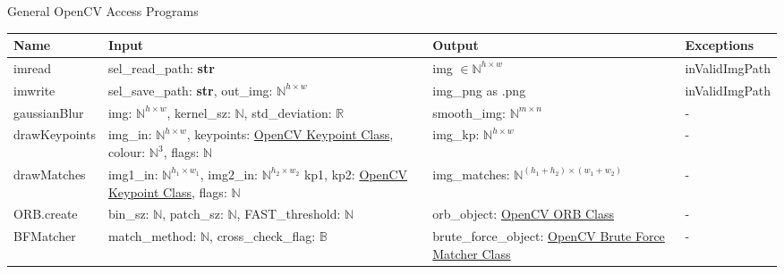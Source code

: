 \documentclass[12pt, titlepage]{article}
\begin{document}
General OpenCV Access Programs
\begin{center}
\begin{tabular}{p{3.5cm} p{4.5cm} p{4.5cm} p{3cm}}
\hline
\textbf{Name} & \textbf{Input} & \textbf{Output} & \textbf{Exceptions} \\
\hline
imread & sel\_read\_path: \textbf{str} & 
img $\in \mathbb{N}^{h \times w}$ & inValidImgPath \\
\hline
imwrite & sel\_save\_path: \textbf{str}, \newline 
out\_img: $\mathbb{N}^{h \times w}$ & 
img\_png as .png & inValidImgPath \\
\hline
gaussianBlur & img: $\mathbb{N}^{h \times w}$, \newline 
kernel\_sz: $\mathbb{N}$, \newline 
std\_deviation: $\mathbb{R}$
& smooth\_img: $\mathbb{N}^{m\times n}$ & -\\
\hline
drawKeypoints & img\_in: $\mathbb{N}^{h \times w}$, \newline
keypoints: \href{https://docs.opencv.org/3.4/d2/d29/classcv_1_1KeyPoint.html}{OpenCV Keypoint Class}, \newline
colour: $\mathbb{N}^{3}$, \newline 
flags: $\mathbb{N}$ 
& img\_kp: $\mathbb{N}^{h \times w}$ & - \\
\hline
drawMatches& img1\_in: $\mathbb{N}^{h_{1} \times w_{1}}$, \newline 
img2\_in: $\mathbb{N}^{h_{2} \times w_{2}}$ \newline 
kp1, kp2: \href{https://docs.opencv.org/3.4/d2/d29/classcv_1_1KeyPoint.html}{OpenCV Keypoint Class}, \newline
flags: $\mathbb{N}$
& img\_matches: $\mathbb{N}^{(h_{1}+h_{2}) \times (w_{1}+w_{2})}$
& - \\
\hline
ORB.create & bin\_sz: $\mathbb{N}$, \newline 
patch\_sz: $\mathbb{N}$, \newline 
FAST\_threshold: $\mathbb{N}$ \newline 
& orb\_object: \href{https://docs.opencv.org/3.4/db/d95/classcv_1_1ORB.html}
{OpenCV ORB Class} & - \\
\hline
BFMatcher 
& match\_method: $\mathbb{N}$, \newline 
cross\_check\_flag: $\mathbb{B}$ 
& brute\_force\_object: \href{https://docs.opencv.org/3.4/d3/da1/classcv_1_1BFMatcher.html}
{OpenCV Brute Force Matcher Class} \newline 
& -\\
\hline
\end{tabular}
\end{center} 
\end{document}

